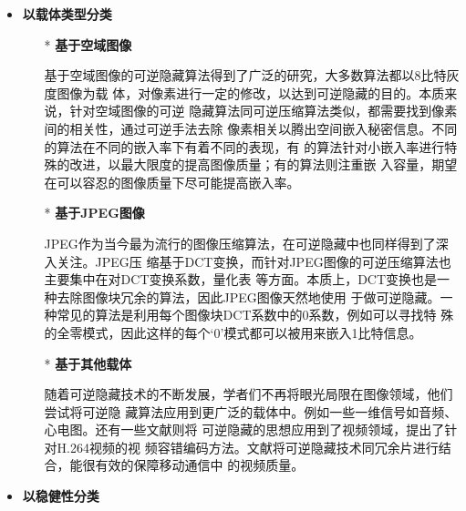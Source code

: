 \begin{itemize}
  \setlength{\parindent}{2em}
  \vspace{-2.5mm}
  \item \textbf{以载体类型分类}\\
  \vspace{-10mm}
  \begin{itemize}
    \setlength{\parindent}{2em}
    \item[*] \textbf{基于空域图像}
    \vspace{-1mm}
    \par
    基于空域图像的可逆隐藏算法得到了广泛的研究，大多数算法都以8比特灰度图像为载
    体，对像素进行一定的修改，以达到可逆隐藏的目的。本质来说，针对空域图像的可逆
    隐藏算法同可逆压缩算法类似，都需要找到像素间的相关性，通过可逆手法去除
    像素相关以腾出空间嵌入秘密信息。不同的算法在不同的嵌入率下有着不同的表现，有
    的算法针对小嵌入率进行特殊的改进，以最大限度的提高图像质量；有的算法则注重嵌
    入容量，期望在可以容忍的图像质量下尽可能提高嵌入率。
    \par
    \vspace{-2mm}
    \item[*] \textbf{基于JPEG图像}
    \vspace{-1mm}
    \par
    JPEG作为当今最为流行的图像压缩算法，在可逆隐藏中也同样得到了深入关注。JPEG压
    缩基于DCT变换，而针对JPEG图像的可逆压缩算法也主要集中在对DCT变换系数，量化表
    等方面。本质上，DCT变换也是一种去除图像块冗余的算法，因此JPEG图像天然地使用
    于做可逆隐藏。一种常见的算法是利用每个图像块DCT系数中的0系数，例如可以寻找特
    殊的全零模式，因此这样的每个‘0’模式都可以被用来嵌入1比特信息。
    \par
    \vspace{-2mm}
    \item[*] \textbf{基于其他载体}
    \vspace{-1mm}
    \par
    随着可逆隐藏技术的不断发展，学者们不再将眼光局限在图像领域，他们尝试将可逆隐
    藏算法应用到更广泛的载体中。例如一些一维信号如音频、心电图。还有一些文献则将
    可逆隐藏的思想应用到了视频领域\cite{xu2014improved}，提出了针对H.264视频的视
    频容错编码方法。文献将可逆隐藏技术同冗余片进行结合，能很有效的保障移动通信中
    的视频质量。\\
  \end{itemize}
  \vspace{-11mm}
  \item \textbf{以稳健性分类}\\

\end{itemize}

